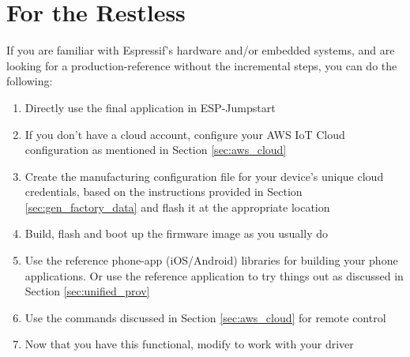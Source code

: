 \documentclass[main.tex]{subfiles}
\begin{document}
\section{For the Restless}
If you are familiar with Espressif's hardware and/or embedded systems, and are looking for a production-reference without the incremental steps, you can do the following: 

\begin{enumerate}
    \item Directly use the final application in ESP-Jumpstart
    \item If you don't have a cloud account, configure your AWS IoT Cloud configuration as mentioned in Section \ref{sec:aws_cloud}
    \item Create the manufacturing configuration file for your device's unique cloud credentials, based on the instructions provided in Section \ref{sec:gen_factory_data} and flash it at the appropriate location
    \item Build, flash and boot up the firmware image as you usually do
    \item Use the reference phone-app (iOS/Android) libraries for building your phone applications. Or use the reference application to try things out as discussed in Section \ref{sec:unified_prov}
    \item Use the commands discussed in Section \ref{sec:aws_cloud} for remote control
    \item Now that you have this functional, modify to work with your driver
\end{enumerate}
\end{document}
